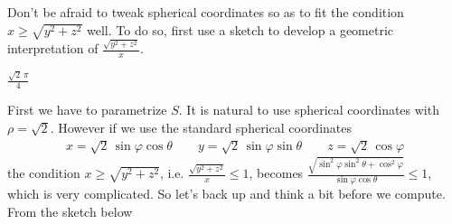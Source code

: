 \begin{hint} 
Don't be afraid to tweak spherical coordinates so as to fit the
condition $x \ge \sqrt{y^2 + z^2}$ well. To do so, first use a sketch
to develop a geometric interpretation of $\frac{\sqrt{y^2 + z^2}}{x}$.
\end{hint}

\begin{answer} 
$\frac{\sqrt{2}\,\pi}{4}$
\end{answer}

\begin{solution} First we have to parametrize $S$. It is natural
to use spherical coordinates with $\rho=\sqrt{2}$. However if we use
the standard spherical coordinates 
\begin{align*}
x=\sqrt{2}\,\sin\varphi\cos\theta \qquad
y=\sqrt{2}\,\sin\varphi\sin\theta \qquad
z=\sqrt{2}\,\cos\varphi
\end{align*}
the condition $x \ge \sqrt{y^2 + z^2}$, i.e.  $\frac{\sqrt{y^2 + z^2}}{x}\le 1$,
becomes $\frac{\sqrt{\sin^2\varphi\sin^2\theta+\cos^2\varphi}}{\sin\varphi\cos\theta}
\le 1$, which is very complicated. So let's back up
and think a bit before we compute. From the sketch below 
\end{solution}
